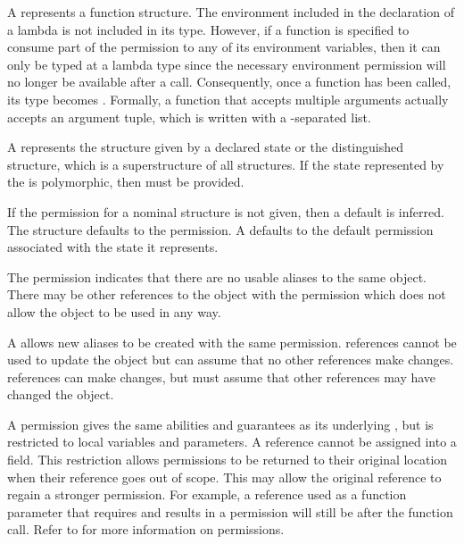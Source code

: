 A  represents a function structure.  
The environment included in the declaration of a lambda is
not included in its type.  However, if a function is specified to 
consume part of the permission to any of its environment variables, 
then it can only be typed at a 
lambda type since the necessary environment permission will no
longer be available after a call.  Consequently, once a 
 function has been called, its type becomes .
Formally, a function that accepts multiple arguments actually accepts an
argument tuple, which is written with a \code{*}-separated list.

A  represents the structure 
given by a declared state
or the distinguished  structure, which is a superstructure
of all structures.  If the state represented by the 
is polymorphic, then  must be provided.

If the permission for a nominal structure is not given, 
then a default is inferred.  The  structure 
defaults to the  permission.  A  defaults 
to the default permission associated with the state it represents.

The  permission indicates that there are no
usable aliases to the same object.  There may be other
references to the object with the  permission
which does not allow the object to be used in any way.

A  allows new aliases to be 
created with the same permission.
 references cannot be used to update the object
but can assume that no other references make changes. 
 references can make changes, but must assume that other
references may have changed the object.

A  permission gives the same abilities
and guarantees as its underlying , 
but is restricted to local variables and parameters.  
A  reference cannot be assigned into a field.
This restriction allows  permissions to be
returned to their original location when their reference goes out of 
scope.  This may allow the original reference to regain a stronger permission.
For example, a  reference used as a function parameter
that requires and results in a  permission will
still be  after the function call.  Refer to \cite{naden12:borrowingPermissions}
for more information on  permissions.

